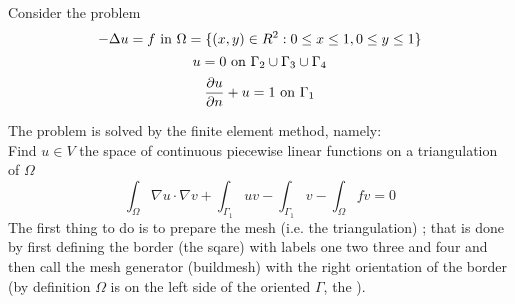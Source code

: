 \documentclass[twoside]{book}
\newif\ifpdf
\begin{document}
\graphicspath{{./}{plots/}}
\ifpdf
\DeclareGraphicsExtensions{.pdf, .jpg, .tif}
\else
{}
\fi

\let\subsubsection\subsection
\let\subsection\section
\let\section\chapter



Consider the problem
\begin{equation}
 -\Delta u = f \hbox{ in } \Omega=\{(x,y)\in R^2 : 0 \le x \le 1 , 0 \le y \le 1\}
\end{equation}
\begin{equation}
u=0 \hbox{ on } \Gamma_2 \cup \Gamma_3 \cup \Gamma_4
\end{equation}
\begin{equation}
\frac{\partial u}{\partial n} +u = 1 \hbox{ on } \Gamma_1 
\end{equation}

The problem is solved by the finite element method, namely:
\\
Find $u\in V$ the space of continuous piecewise linear functions
on a triangulation of $\Omega$ 
\begin{equation}
    \int_\Omega \nabla u\cdot\nabla v + \int_{\Gamma_1} uv - \int_{\Gamma_1} v -  \int_\Omega fv  = 0
\end{equation}
The first thing to do is to prepare the mesh (i.e. the triangulation) ;
that is done by first defining the border (the sqare) with labels one two three and four  and then call the mesh generator (buildmesh) with
the right orientation of the border (by definition $\Omega$ is
on the left side of the oriented $\Gamma$, the ).
\end{document}
